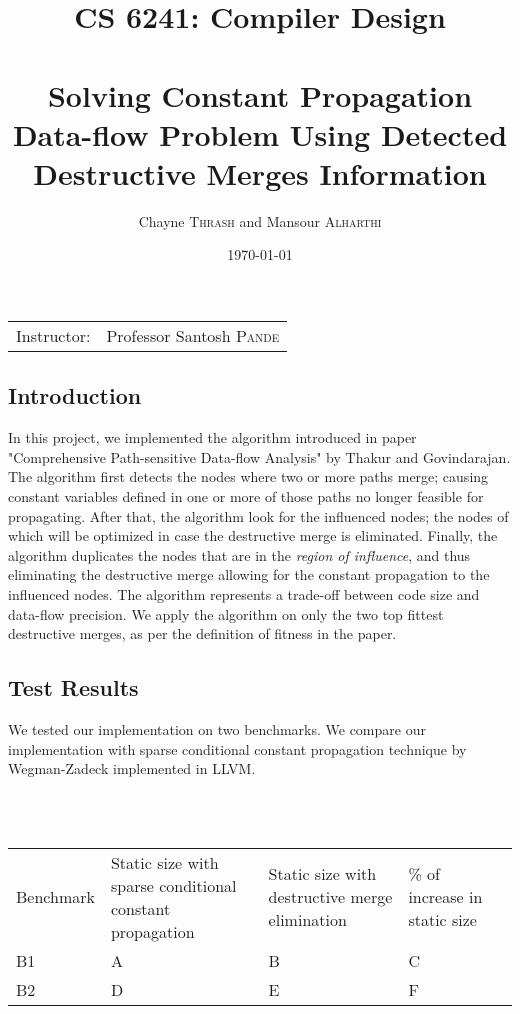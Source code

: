 \documentclass{article}
\title{CS 6241: Compiler Design \\~\\ Solving Constant Propagation Data-flow Problem Using Detected Destructive Merges Information} %
\author{Chayne \textsc{Thrash} and Mansour \textsc{Alharthi}} %
\date{\today} %
\begin{document}
\maketitle %

\begin{center}
\begin{tabular}{l r}
Instructor: & Professor Santosh \textsc{Pande} %
\end{tabular}
\end{center}

\subsection{Introduction}
In this project, we implemented the algorithm introduced in paper "Comprehensive Path-sensitive Data-flow Analysis" by Thakur and Govindarajan. The algorithm first detects the nodes where two or more paths merge; causing constant variables defined in one or more of those paths no longer feasible for propagating. After that, the algorithm look for the influenced nodes; the nodes of which will be optimized in case the destructive merge is eliminated. Finally, the algorithm duplicates the nodes that are in the \textit{region of influence}, and thus eliminating the destructive merge allowing for the constant propagation to the influenced nodes. The algorithm represents a trade-off between code size and data-flow precision. We apply the algorithm on only the two top fittest destructive merges, as per the definition of fitness in the paper. 

\subsection{Test Results}
We tested our implementation on two benchmarks. We compare our implementation with sparse conditional constant propagation technique by Wegman-Zadeck implemented in LLVM. 

~\\~

\begin{adjustbox}{center}
\renewcommand{\arraystretch}{2}
\begin{tabular}{| C{3cm} | C{3cm} | C{3cm} | C{3cm} | C{3cm} |}
\hline
Benchmark & Static size with sparse conditional constant propagation & Static size with destructive merge elimination & \% of increase in static size \\  
B1 & A & B & C  \\ 
B2 & D & E & F  \\ 
\end{tabular}
\end{adjustbox}
\end{document}
